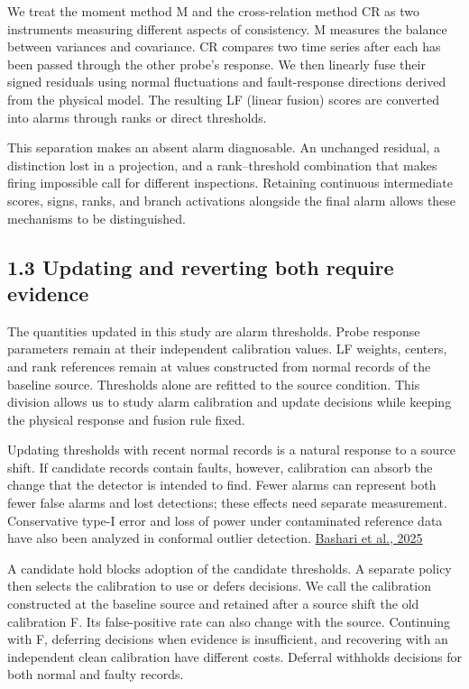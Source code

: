 \documentclass[10pt,a4paper]{article}
\begin{document}
We treat the moment method M and the cross-relation method CR as two instruments measuring different aspects of consistency. M measures the balance between variances and covariance. CR compares two time series after each has been passed through the other probe's response. We then linearly fuse their signed residuals using normal fluctuations and fault-response directions derived from the physical model. The resulting LF (linear fusion) scores are converted into alarms through ranks or direct thresholds.

This separation makes an absent alarm diagnosable. An unchanged residual, a distinction lost in a projection, and a rank–threshold combination that makes firing impossible call for different inspections. Retaining continuous intermediate scores, signs, ranks, and branch activations alongside the final alarm allows these mechanisms to be distinguished.

\subsection{1.3 Updating and reverting both require evidence}

The quantities updated in this study are alarm thresholds. Probe response parameters remain at their independent calibration values. LF weights, centers, and rank references remain at values constructed from normal records of the baseline source. Thresholds alone are refitted to the source condition. This division allows us to study alarm calibration and update decisions while keeping the physical response and fusion rule fixed.

Updating thresholds with recent normal records is a natural response to a source shift. If candidate records contain faults, however, calibration can absorb the change that the detector is intended to find. Fewer alarms can represent both fewer false alarms and lost detections; these effects need separate measurement. Conservative type-I error and loss of power under contaminated reference data have also been analyzed in conformal outlier detection. \href{https://proceedings.mlr.press/v267/bashari25a.html}{Bashari et al., 2025}

A candidate hold blocks adoption of the candidate thresholds. A separate policy then selects the calibration to use or defers decisions. We call the calibration constructed at the baseline source and retained after a source shift the old calibration F. Its false-positive rate can also change with the source. Continuing with F, deferring decisions when evidence is insufficient, and recovering with an independent clean calibration have different costs. Deferral withholds decisions for both normal and faulty records.
\end{document}
